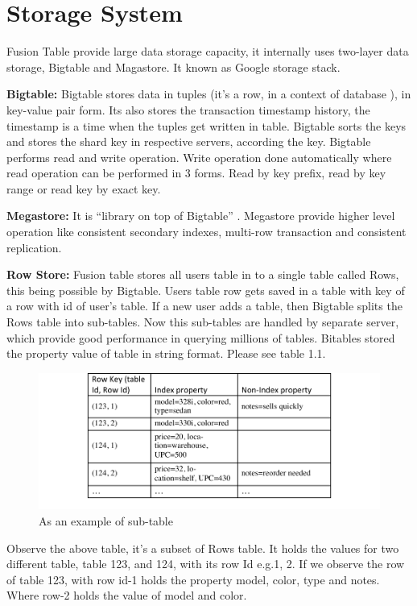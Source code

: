 \documentclass[9pt,twocolumn,twoside]{../../styles/osajnl}
\begin{document}
\section{Storage System}

Fusion Table provide large data storage capacity, it internally uses two-layer data storage, Bigtable and Magastore. It known as Google storage stack.

\textbf{Bigtable:} Bigtable stores data in tuples (it’s a row, in a context of database ), in key-value pair form. Its also stores the transaction timestamp history, the timestamp is a time when the tuples get written in table. Bigtable sorts the keys and stores the shard key in respective servers, according the key. Bigtable performs read and write operation. Write operation done automatically where read operation can be performed in 3 forms. Read by key prefix, read by key range or read key by exact key. 

\textbf{Megastore:}  It is “library on top of Bigtable” \cite{www-6}. Megastore provide higher level operation like consistent secondary indexes, multi-row transaction and consistent replication.

\textbf{Row Store:} Fusion table stores all users table in to a single table called Rows, this being possible by Bigtable. Users table row gets saved in a table with key of a row with id of user’s table. If a new user adds a table, then Bigtable splits the Rows table into sub-tables. Now this sub-tables are handled by separate server, which provide good performance in querying millions of tables. Bitables stored the property value of table in string format. Please see table 1.1.

\begin{figure}[htbp]
	\centering
	\includegraphics[width=\linewidth]{images/table1}
	\caption{As an example of sub-table}
	\label{fig:false-color}
\end{figure}


Observe the above table, it’s a subset of Rows table. It holds the values for two different table, table 123, and 124, with its row Id e.g.1, 2. If we observe the row of table 123, with row id-1 holds the property model, color, type and notes. Where row-2 holds the value of model and color.
\end{document}
